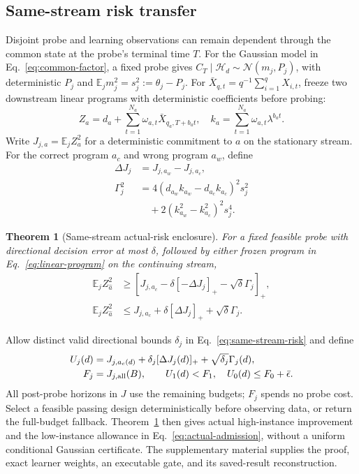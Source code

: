 \documentclass[journal]{IEEEtran}
\newtheorem{theorem}{Theorem}
\newcommand{\E}{\mathbb{E}}
\begin{document}
\subsection{Same-stream risk transfer}
Disjoint probe and learning observations can remain dependent through the common state at the probe's terminal time $T$.
For the Gaussian model in Eq.~\eqref{eq:common-factor}, a fixed probe gives $C_T\mid\mathcal H_d\sim\mathcal N(m_j,P_j)$, with deterministic $P_j$ and $\E_jm_j^2=s_j^2:=\theta_j-P_j$.
For $\bar X_{q,t}=q^{-1}\sum_{i=1}^qX_{i,t}$, freeze two downstream linear programs with deterministic coefficients before probing:
\begin{equation}
Z_a=d_a+\sum_{t=1}^{N_a}\omega_{a,t}\bar X_{q_a,T+b_at},
\quad
k_a=\sum_{t=1}^{N_a}\omega_{a,t}\lambda^{b_at}.
\label{eq:linear-program}
\end{equation}
Write $J_{j,a}=\E_jZ_a^2$ for a deterministic commitment to $a$ on the stationary stream.
For the correct program $a_c$ and wrong program $a_w$, define
\begin{align}
\Delta J_j&=J_{j,a_w}-J_{j,a_c},\nonumber\\
\Gamma_j^2&=4(d_{a_w}k_{a_w}-d_{a_c}k_{a_c})^2s_j^2\nonumber\\
&\quad+2(k_{a_w}^2-k_{a_c}^2)^2s_j^4.
\label{eq:selection-carryover}
\end{align}
\begin{theorem}[Same-stream actual-risk enclosure]
For a fixed feasible probe with directional decision error at most $\delta$, followed by either frozen program in Eq.~\eqref{eq:linear-program} on the continuing stream,
\begin{align}
\E_jZ_{\widehat a}^2
&\ge\left[J_{j,a_c}-\delta[-\Delta J_j]_+-\sqrt\delta\Gamma_j\right]_+,\nonumber\\
\E_jZ_{\widehat a}^2
&\le J_{j,a_c}+\delta[\Delta J_j]_++\sqrt\delta\Gamma_j.
\label{eq:same-stream-risk}
\end{align}
\label{thm:same-stream}
\end{theorem}
Allow distinct valid directional bounds $\delta_j$ in Eq.~\eqref{eq:same-stream-risk} and define
\begin{align}
U_j(d)&=J_{j,a_c(d)}+\delta_j[\Delta J_j(d)]_+
+\sqrt{\delta_j}\Gamma_j(d),\nonumber\\
F_j&=J_{j,{\rm all}}(B),\qquad
U_1(d)<F_1,\quad U_0(d)\le F_0+\bar\epsilon.
\label{eq:actual-admission}
\end{align}
All post-probe horizons in $J$ use the remaining budgets; $F_j$ spends no probe cost.
Select a feasible passing design deterministically before observing data, or return the full-budget fallback.
Theorem~\ref{thm:same-stream} then gives actual high-instance improvement and the low-instance allowance in Eq.~\eqref{eq:actual-admission}, without a uniform conditional Gaussian certificate.
The supplementary material supplies the proof, exact learner weights, an executable gate, and its saved-result reconstruction.
\end{document}
